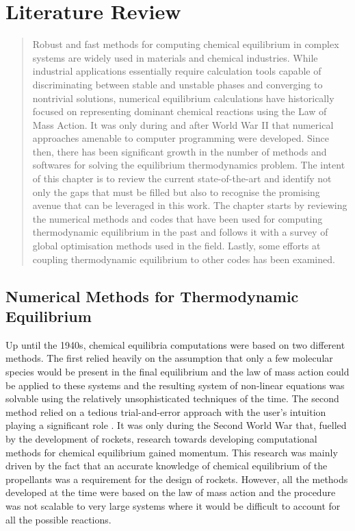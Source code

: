 \chapter{Literature Review} \label{chap:litreview}
\begin{abstract}
    Robust and fast methods for computing chemical equilibrium in complex systems are widely used in materials and chemical industries. While industrial applications essentially require calculation tools capable of discriminating between stable and unstable phases and converging to nontrivial solutions, numerical equilibrium calculations have historically focused on representing dominant chemical reactions using the Law of Mass Action. It was only during and after World War {II} that numerical approaches amenable to computer programming were developed. Since then, there has been significant growth in the number of methods and softwares for solving the equilibrium thermodynamics problem. The intent of this chapter is to review the current state-of-the-art and identify not only the gaps that must be filled but also to recognise the promising avenue that can be leveraged in this work. The chapter starts by reviewing the numerical methods and codes that have been used for computing thermodynamic equilibrium in the past and follows it with a survey of global optimisation methods used in the field. Lastly, some efforts at coupling thermodynamic equilibrium to other codes has been examined.
\end{abstract}
	
\section{Numerical Methods for Thermodynamic Equilibrium}
	Up until the 1940s, chemical equilibria computations were based on two different methods. The first relied heavily on the assumption that only a few molecular species would be present in the final equilibrium and the law of mass action could be applied to these systems and the resulting system of non-linear equations was solvable using the relatively unsophisticated techniques of the time. The second method relied on a tedious trial-and-error approach with the user's intuition playing a significant role \cite{vanZeggeren11}. It was only during the Second World War that, fuelled by the development of rockets, research towards developing computational methods for chemical equilibrium gained momentum. This research was mainly driven by the fact that an accurate knowledge of chemical equilibrium of the propellants was a requirement for the design of rockets. However, all the methods developed at the time were based on the law of mass action and the procedure was not scalable to very large systems where it would be difficult to account for all the possible reactions.

